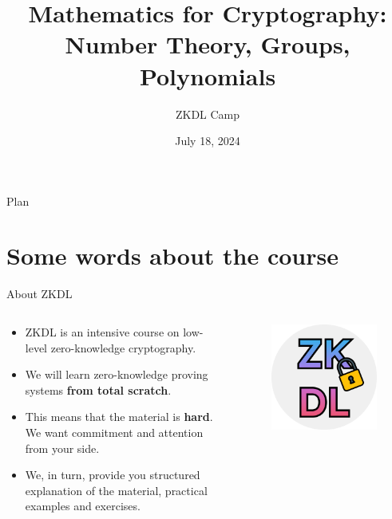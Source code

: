 \documentclass{beamer}
\title[Mathematics I]{\textbf{Mathematics for Cryptography: Number Theory, Groups, Polynomials}}
\author{ZKDL Camp}
\date{July 18, 2024}
\begin{document}
    \frame {
      \titlepage
    }
  
    \begin{frame}{Plan}
      \tableofcontents
    \end{frame}

    \section{Some words about the course}
    \begin{frame}{About ZKDL} 

      \begin{columns}
        \begin{column}{0.7\textwidth}
          \begin{itemize}
            \item ZKDL is an intensive course on low-level zero-knowledge cryptography.
            \item We will learn zero-knowledge proving systems \textbf{from total scratch}.
            \item This means that the material is \textbf{hard}. We want commitment and attention from your side.
            \item We, in turn, provide you structured explanation of the material, practical examples and exercises.
          \end{itemize}
        \end{column}
        \begin{column}{0.3\textwidth}
            \begin{figure}
            \centering
                \includegraphics[width=1\textwidth]{images/logo.png}
            \end{figure}
        \end{column}
        \end{columns}


\end{frame}
\end{document}
